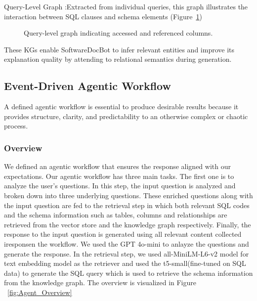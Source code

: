 \documentclass[11pt]{article}
\begin{document}
Query-Level Graph :Extracted from individual queries, this graph illustrates the interaction between SQL clauses and schema elements (Figure~\ref{fig:query-graph})
\begin{figure}[h]
\centering
\setlength\fboxrule{1pt}  %
\setlength\fboxsep{0pt}   %
\caption{Query-level graph indicating accessed and referenced columns.}
\label{fig:query-graph}
\end{figure}



These KGs enable SoftwareDocBot to infer relevant entities and improve its explanation quality by attending to relational semantics during generation.



\subsection{Event-Driven Agentic Workflow }
A defined agentic workflow is essential to produce desirable results because it provides structure, clarity, and predictability to an otherwise complex or chaotic process.
\subsubsection{Overview}
  We defined an agentic workflow that ensures the response aligned with our expectations. Our agentic workflow has three main tasks. The first one is to analyze the user's questions. In this step, the input question is analyzed and broken down into three underlying questions. These enriched questions along with the input question are fed to the retrieval step in which both relevant SQL codes and the schema information such as tables, columns and relationships are retrieved from the vector store and the knowledge graph respectively. Finally, the response to the input question is generated using all relevant content collected iresponsen the workflow. We used the GPT 4o-mini to anlayze the questions and generate the response. In the retrieval step, we used all-MiniLM-L6-v2 model for text embedding model as the retriever and used the t5-small(fine-tuned on SQL data) to generate the SQL query which is used to retrieve the schema information from the knowledge graph. The overview is visualized in Figure ~\ref{fig:Agent_Overview}

\begin{figure*}[h]
\centering
\setlength\fboxrule{1pt}  %
\setlength\fboxsep{0pt}   %
\caption{Overview of Agentic Workflow}
\label{fig:Agent_Overview}
\end{figure*}
\end{document}
